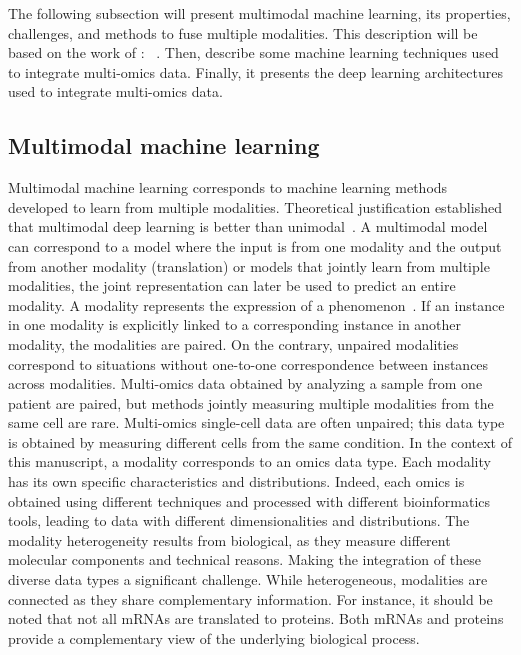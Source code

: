 \documentclass[../main.tex]{subfiles}
\begin{document}
	The following subsection will present multimodal machine learning, its properties, challenges, and methods to fuse multiple modalities.
	This description will be based on the work of \citeauthor{MML_morency}: ~\cite{MML_morency}.
	Then, describe some machine learning techniques used to integrate multi-omics data.
	Finally, it presents the deep learning architectures used to integrate multi-omics data.

	\subsection{Multimodal machine learning}
		Multimodal machine learning corresponds to machine learning methods developed to learn from multiple modalities.
		Theoretical justification established that multimodal deep learning is better than unimodal~\cite{NEURIPS2021_5aa3405a}.
		A multimodal model can correspond to a model where the input is from one modality and the output from another modality (translation) or models that jointly learn from multiple modalities, the joint representation can later be used to predict an entire modality.
		A modality represents the expression of a phenomenon~\cite{MML_morency}.
		If an instance in one modality is explicitly linked to a corresponding instance in another modality, the modalities are paired.
		On the contrary, unpaired modalities correspond to situations without one-to-one correspondence between instances across modalities.
		Multi-omics data obtained by analyzing a sample from one patient are paired, but methods jointly measuring multiple modalities from the same cell are rare.
		Multi-omics single-cell data are often unpaired; this data type is obtained by measuring different cells from the same condition.
		In the context of this manuscript, a modality corresponds to an omics data type.
		Each modality has its own specific characteristics and distributions.
		Indeed, each omics is obtained using different techniques and processed with different bioinformatics tools, leading to data with different dimensionalities and distributions.
		The modality heterogeneity results from biological, as they measure different molecular components and technical reasons.
		Making the integration of these diverse data types a significant challenge.
		While heterogeneous, modalities are connected as they share complementary information.
		For instance, it should be noted that not all mRNAs are translated to proteins.
		Both mRNAs and proteins provide a complementary view of the underlying biological process.
\end{document}
